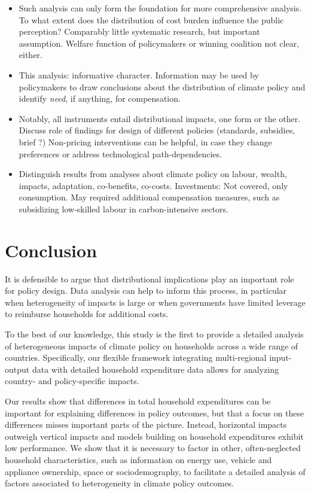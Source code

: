 \documentclass[12pt, a4paper]{article}
\begin{document}
\begin{itemize}
\item Such analysis can only form the foundation for more comprehensive analysis. To what extent does the distribution of cost burden influence the public perception? Comparably little systematic research, but important assumption. Welfare function of policymakers or winning coalition not clear, either. 
\item This analysis: informative character. Information may be used by policymakers to draw conclusions about the distribution of climate policy and identify \textit{need}, if anything, for compensation. 
\item Notably, all instruments entail distributional impacts, one form or the other. Discuss role of findings for design of different policies (standards, subsidies, brief ?) Non-pricing interventions can be helpful, in case they change preferences or address technological path-dependencies.
\item Distinguish results from analyses about climate policy on labour, wealth, impacts, adaptation, co-benefits, co-costs. Investments: Not covered, only consumption. May required additional compensation measures, such as subsidizing low-skilled labour in carbon-intensive sectors.
\end{itemize}

\section{Conclusion} \label{sec:conclusion}
It is defensible to argue that distributional implications play an important role for policy design. Data analysis can help to inform this process, in particular when heterogeneity of impacts is large or when governments have limited leverage to reimburse households for additional costs.

To the best of our knowledge, this study is the first to provide a detailed analysis of heterogeneous impacts of climate policy on households across a wide range of countries. Specifically, our flexible framework integrating multi-regional input-output data with detailed household expenditure data allows for analyzing country- and policy-specific impacts.

Our results show that differences in total household expenditures can be important for explaining differences in policy outcomes, but that a focus on these differences misses important parts of the picture. Instead, horizontal impacts outweigh vertical impacts and models building on household expenditures exhibit low performance. We show that it is necessary to factor in other, often-neglected household characteristics, such as information on energy use, vehicle and appliance ownership, space or sociodemography, to facilitate a detailed analysis of factors associated to heterogeneity in climate policy outcomes.
\end{document}
